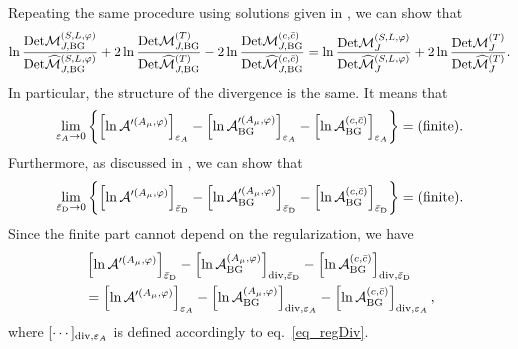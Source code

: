 \documentclass[12pt]{article}
\begin{document}
Repeating the same procedure using solutions given in
\cite{Endo:2017gal}, we can show that
\begin{align}
 \ln\frac{\det\mathcal M^{(S,L,\varphi)}_{J,\rm BG}}{\det\widehat{\mathcal M}^{(S,L,\varphi)}_{J,\rm BG}}
 +2\ln\frac{\det\mathcal M^{(T)}_{J,\rm BG}}{\det\widehat{\mathcal M}^{(T)}_{J,\rm BG}}
 -2\ln\frac{\det\mathcal M^{(c,\bar{c})}_{J,\rm BG}}{\det\widehat{\mathcal M}^{(c,\bar{c})}_{J,\rm BG}}
 = \ln\frac{\det\mathcal M^{(S,L,\varphi)}_{J}}{\det\widehat{\mathcal M}^{(S,L,\varphi)}_{J}}
 +2\ln\frac{\det\mathcal M^{(T)}_{J}}{\det\widehat{\mathcal M}^{(T)}_{J}}.
\end{align}
In particular, the structure of the divergence is the same. It means
that
\begin{align}
 \lim_{\eps{A}\to0}
 \left\{
  \left[
   \ln\mathcal A'^{(A_\mu,\varphi)}
  \right]_{\eps{A}}-
  \left[
   \ln\mathcal A'^{(A_\mu,\varphi)}_{\rm BG}
  \right]_{\eps{A}}-
  \left[
   \ln\mathcal A_{\rm BG}^{(c,\bar{c})}
  \right]_{\eps{A}}
 \right\} = (\rm finite).
\end{align}
Furthermore, as discussed in \cite{Endo:2017tsz}, we can show that
\begin{align}
 \lim_{\epsD\to0}
 \left\{
  \left[
   \ln\mathcal A'^{(A_\mu,\varphi)}
  \right]_{\epsD}-
  \left[
   \ln\mathcal A'^{(A_\mu,\varphi)}_{\rm BG}
  \right]_{\epsD}-
  \left[
   \ln\mathcal A_{\rm BG}^{(c,\bar{c})}
  \right]_{\epsD}
 \right\} = (\rm finite).
\end{align}
Since the finite part cannot depend on the regularization, we have
\begin{align}
  &
 \left[
  \ln\mathcal A'^{(A_\mu,\varphi)}
 \right]_{\epsD}-
 \left[
  \ln\mathcal A^{(A_\mu,\varphi)}_{\rm BG}
 \right]_{{\rm div},\epsD}-
 \left[
  \ln\mathcal A_{\rm BG}^{(c,\bar{c})}
 \right]_{{\rm div},\epsD}\nonumber \\
  & =
 \left[
  \ln\mathcal A'^{(A_\mu,\varphi)}
 \right]_{\eps{A}}-
 \left[
  \ln\mathcal A^{(A_\mu,\varphi)}_{\rm BG}
 \right]_{{\rm div},\eps{A}}-
 \left[
  \ln\mathcal A_{\rm BG}^{(c,\bar{c})}
 \right]_{{\rm div},\eps{A}},
\end{align}
where $[\cdots]_{{\rm div},\eps{A}}$ is defined accordingly to
eq.~\eqref{eq_regDiv}.
\end{document}
